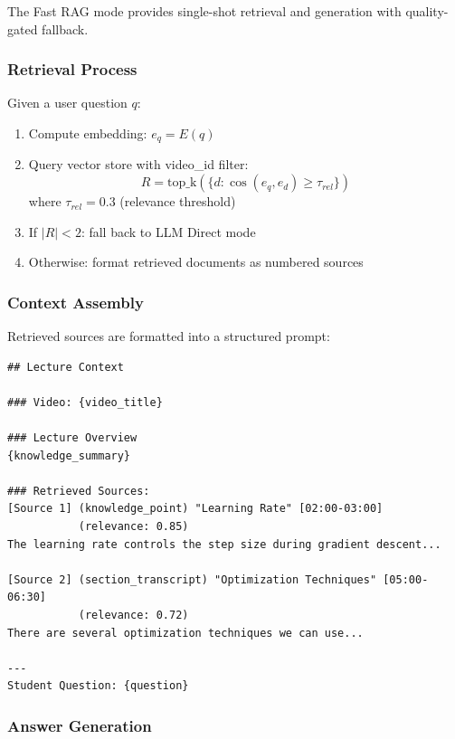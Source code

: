 The Fast RAG mode provides single-shot retrieval and generation with quality-gated fallback.

\subsubsection{Retrieval Process}

Given a user question $q$:

\begin{enumerate}
    \item Compute embedding: $e_q = E(q)$
    \item Query vector store with video\_id filter:
    \begin{equation}
        R = \text{top\_k}(\{d : \cos(e_q, e_d) \geq \tau_{rel}\})
    \end{equation}
    where $\tau_{rel} = 0.3$ (relevance threshold)
    \item If $|R| < 2$: fall back to LLM Direct mode
    \item Otherwise: format retrieved documents as numbered sources
\end{enumerate}

\subsubsection{Context Assembly}

Retrieved sources are formatted into a structured prompt:

\begin{lstlisting}[language=text, caption={RAG Context Template}]
## Lecture Context

### Video: {video_title}

### Lecture Overview
{knowledge_summary}

### Retrieved Sources:
[Source 1] (knowledge_point) "Learning Rate" [02:00-03:00] 
           (relevance: 0.85)
The learning rate controls the step size during gradient descent...

[Source 2] (section_transcript) "Optimization Techniques" [05:00-06:30]
           (relevance: 0.72)
There are several optimization techniques we can use...

---
Student Question: {question}
\end{lstlisting}

\subsubsection{Answer Generation}

